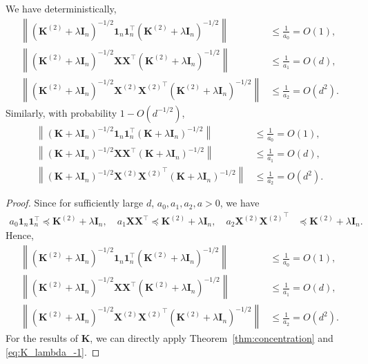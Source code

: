\documentclass[twoside,11pt]{article}
\def\bI{{\mathbf I}}
\def\bK{{\boldsymbol K}}
\def\bX{{\boldsymbol X}}
\renewcommand{\bK}{\boldsymbol{K}}
\newcommand{\1}{\mathbf{1}}
\begin{document}
\begin{lemma}\label{lemm:inverseK_mix_bound}
 We have deterministically,
     \begin{align}
      \left\|(\bK^{(2)} +\lambda\bI_n)^{-1/2}\1_n\1_n^\top (\bK^{(2)} +\lambda\bI_n)^{-1/2}\right\|&\leq \frac{1}{a_0}=O(1), \label{eq:inverseKX1}\\
        \left\|(\bK^{(2)} +\lambda\bI_n)^{-1/2}\bX\bX^\top(\bK^{(2)} +\lambda\bI_n)^{-1/2}\right\|&\leq \frac{1}{a_1} =O(d), \label{eq:inverseKX}\\
        \left\|(\bK^{(2)} +\lambda\bI_n)^{-1/2}\bX^{(2)}{\bX^{(2)}}^\top (\bK^{(2)} +\lambda\bI_n)^{-1/2}\right\|&\leq \frac{1}{a_2}=O(d^2) \label{eq:inverseKX2}.
     \end{align}
     Similarly, with probability $1-O(d^{-1/2})$,
          \begin{align}
      \left\|(\bK +\lambda\bI_n)^{-1/2}\1_n\1_n^\top (\bK +\lambda\bI_n)^{-1/2}\right\|&\leq \frac{1}{a_0}=O(1),  \\
        \left\|(\bK +\lambda\bI_n)^{-1/2}\bX\bX^\top(\bK  +\lambda\bI_n)^{-1/2}\right\|&\leq \frac{1}{a_1} =O(d),  \\
        \left\|(\bK +\lambda\bI_n)^{-1/2}\bX^{(2)}{\bX^{(2)}}^\top (\bK +\lambda\bI_n)^{-1/2}\right\|&\leq \frac{1}{a_2}=O(d^2)  .
     \end{align}
\end{lemma}
\begin{proof}
 Since for sufficiently large $d$, $a_0, a_1, a_2, a>0$, we have 
     \begin{align}
     a_0 \1_n\1_n^\top \preccurlyeq \bK^{(2)}+\lambda \bI_n, \quad 
          a_1 \bX\bX^\top \preccurlyeq \bK^{(2)}+\lambda \bI_n, \quad 
           a_2 \bX^{(2)}{\bX^{(2)}}^\top &\preccurlyeq \bK^{(2)}+\lambda \bI_n.
     \end{align}
          Hence,
     \begin{align}
      \left\|(\bK^{(2)} +\lambda\bI_n)^{-1/2}\1_n\1_n^\top (\bK^{(2)} +\lambda\bI_n)^{-1/2}\right\|&\leq \frac{1}{a_0}=O(1),  \\
        \left\|(\bK^{(2)} +\lambda\bI_n)^{-1/2}\bX\bX^\top(\bK^{(2)} +\lambda\bI_n)^{-1/2}\right\|&\leq \frac{1}{a_1} =O(d),  \\
        \left\|(\bK^{(2)} +\lambda\bI_n)^{-1/2}\bX^{(2)}{\bX^{(2)}}^\top (\bK^{(2)} +\lambda\bI_n)^{-1/2}\right\|&\leq \frac{1}{a_2}=O(d^2)  .
     \end{align}
     For the results of $\bK$, we can directly apply Theorem~\ref{thm:concentration} and \eqref{eq:K_lambda_-1}.
\end{proof}
\end{document}

